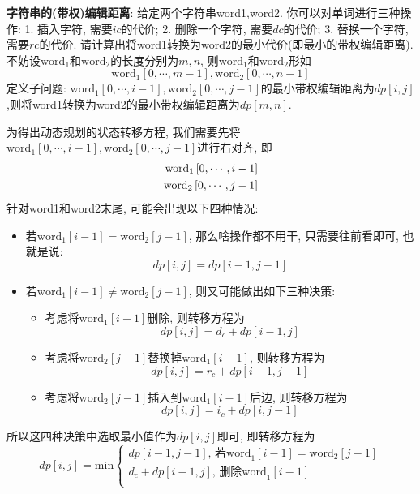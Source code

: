 \documentclass{article}
\begin{document}
\begin{homeworkProblem}
	\textbf{字符串的(带权)编辑距离}: 给定两个字符串word1,word2. 你可以对单词进行三种操作: 1. 插入字符, 需要$ic$的代价; 2. 删除一个字符, 需要$dc$的代价; 3. 替换一个字符, 需要$rc$的代价. 请计算出将word1转换为word2的最小代价(即最小的带权编辑距离).
	\\

	\solution 不妨设$\text{word}_1$和$\text{word}_2$的长度分别为$m,n$, 则$\text{word}_1$和$\text{word}_2$形如$$\text{word}_1\left[ 0,\cdots ,m-1 \right] ,\text{word}_2\left[ 0,\cdots ,n-1 \right] $$
	定义子问题: $\text{word}_1\left[ 0,\cdots ,i-1 \right] ,\text{word}_2\left[ 0,\cdots ,j-1 \right] $的最小带权编辑距离为$dp[i,j]$,则将word1转换为word2的最小带权编辑距离为$dp[m,n]$. 
	
	为得出动态规划的状态转移方程, 我们需要先将$\text{word}_1\left[ 0,\cdots ,i-1 \right] ,\text{word}_2\left[ 0,\cdots ,j-1 \right] $进行右对齐, 即
	\begin{align}
		\text{word}_1\left[ 0,\cdots ,i-1 \right] \notag
		\\
		\text{word}_2\left[ 0,\cdots ,j-1 \right] \notag
	\end{align}
	针对word1和word2末尾, 可能会出现以下四种情况:
	\begin{itemize}
		\item 若$\text{word}_1[i-1]=\text{word}_2[j-1]$, 那么啥操作都不用干, 只需要往前看即可, 也就是说: $$dp\left[ i,j \right] =dp\left[ i-1,j-1 \right] $$
		\item 若$\text{word}_1[i-1] \neq \text{word}_2[j-1]$, 则又可能做出如下三种决策:
		\begin{itemize}
			\item 考虑将$\text{word}_1[i-1]$删除, 则转移方程为$$dp\left[ i,j \right] =d_c+dp\left[ i-1,j \right] $$
			\item 考虑将$\text{word}_2[j-1]$替换掉$\text{word}_1[i-1]$, 则转移方程为$$dp\left[ i,j \right] =r_c+dp\left[ i-1,j-1 \right] $$
			\item 考虑将$\text{word}_2[j-1]$插入到$\text{word}_1[i-1]$后边, 则转移方程为$$dp\left[ i,j \right] =i_c+dp\left[ i,j-1 \right] $$
		\end{itemize}
	\end{itemize}
	所以这四种决策中选取最小值作为$dp[i,j]$即可, 即转移方程为$$dp\left[ i,j \right] =\text{min} \begin{cases}
		dp\left[ i-1,j-1 \right] , \,\text{若word}_1\left[ i-1 \right] =\text{word}_2\left[ j-1 \right]\\
		d_c+dp\left[ i-1,j \right] , \, \text{删除word}_1\left[ i-1 \right]\\

\end{cases}$$
\end{homeworkProblem}
\end{document}
